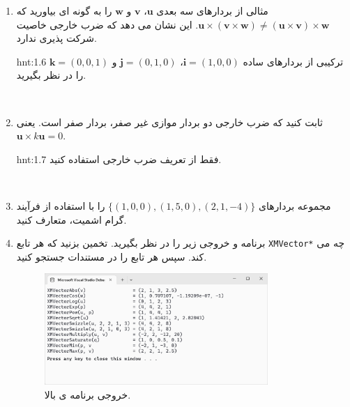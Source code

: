 {\begin{spacing}{1.5}
\begin{enumerate}[label=\textbf{\arabic*}.]
\begin{figure}[H]
                \caption {متوازی الاضلاع توسط دو بردار سه بعدی $\textbf{u}$ و $\textbf{v}$. متوازی الاضلاع دارای پایه $\norm{\textbf{v}}$ و ارتفاع $\textbf{h}$ است.}
                \label{fig:4.Session.1.1.21}
            \end{figure}
            \\
            \item {مثالی از بردارهای سه بعدی $\textbf{u}$، $\textbf{v}$ و $\textbf{w}$ را به گونه ای بیاورید که $\textbf{u}\times(\textbf{v}\times\textbf{w})\neq(\textbf{u}\times\textbf{v})\times\textbf{w}$. این نشان می دهد که ضرب خارجی خاصیت شرکت پذیری ندارد.}
            \begin{hint}{hnt:1.6}
                \Large
                ترکیبی از بردارهای ساده $\textbf{i}=(1,0,0)$، $\textbf{j}=(0,1,0)$ و $\textbf{k}=(0,0,1)$ را در نظر بگیرید.
            \end{hint}
            \\
            \item {ثابت کنید که ضرب خارجی دو بردار موازی غیر صفر، بردار صفر است. یعنی $\textbf{u}\times k\textbf{u}=0$.}
            \begin{hint}{hnt:1.7}
                \Large
                فقط از تعریف ضرب خارجی استفاده کنید.
            \end{hint}
            \\
            \item {مجموعه بردارهای $\{(1, 0, 0), (1, 5, 0), (2, 1, -4)\}$ را با استفاده از فرآیند گرام اشمیت، متعارف کنید.}
            \\
            \item {برنامه و خروجی زیر را در نظر بگیرید.
            تخمین بزنید که هر تابع \texttt{XMVector*} چه می کند. سپس هر تابع را در مستندات  جستجو کنید.}
            \textbf{\vspace{6pt}}
            \lr{}
            \textbf{\vspace{-40pt}}
            \begin{figure}[H]
                \centering
                \setlength{\belowcaptionskip}{-10pt}
                \includegraphics[width=0.8\textwidth]{Images/4/1/4.Session.1.1.22}
                \caption {خروجی برنامه ی بالا.}
                \label{fig:4.Session.1.1.22}
            \end{figure}
        \end{enumerate}
    \end{spacing}
}